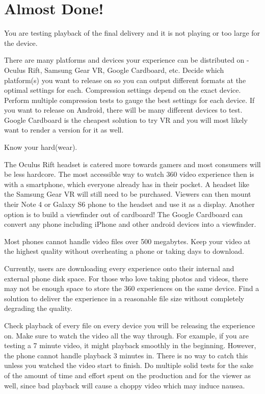 \section{Almost Done!}
\pagecolor{white}
\label{chap:57}
\begin{fullwidth}

\problem

{\large You are testing playback of the final delivery and it is not playing or too large for the device. \par}

There are many platforms and devices your experience can be distributed on - Oculus Rift, Samsung Gear VR, Google Cardboard, etc. Decide which platform(s) you want to release on so you can output different formats at the optimal settings for each. Compression settings depend on the exact device. Perform multiple compression tests to gauge the best settings for each device. If you want to release on Android, there will be many different devices to test. Google Cardboard is the cheapest solution to try VR and you will most likely want to render a version for it as well.

\solutions

{\large Know your hard(wear). \par}

The Oculus Rift headset is catered more towards gamers and most consumers will be less hardcore. The most accessible way to watch 360 video experience then is with a smartphone, which everyone already has in their pocket. A headset like the Samsung Gear VR will still need to be purchased. Viewers can then mount their Note 4 or Galaxy S6 phone to the headset and use it as a display. Another option is to build a viewfinder out of cardboard! The Google Cardboard can convert any phone including iPhone and other android devices into a viewfinder.  
 
Most phones cannot handle video files over 500 megabytes. Keep your video at the highest quality without overheating a phone or taking days to download. 

Currently, users are downloading every experience onto their internal and external phone disk space. For those who love taking photos and videos, there may not be enough space to store the 360 experiences on the same device. Find a solution to deliver the experience in a reasonable file size without completely degrading the quality.

Check playback of every file on every device you will be releasing the experience on. Make sure to watch the video all the way through. For example, if you are testing a 7 minute video, it might playback smoothly in the beginning. However, the phone cannot handle playback 3 minutes in. There is no way to catch this unless you watched the video start to finish. Do multiple solid tests for the sake of the amount of time and effort spent on the production and for the viewer as well, since bad playback will cause a choppy video which may induce nausea. 


\end{fullwidth}
